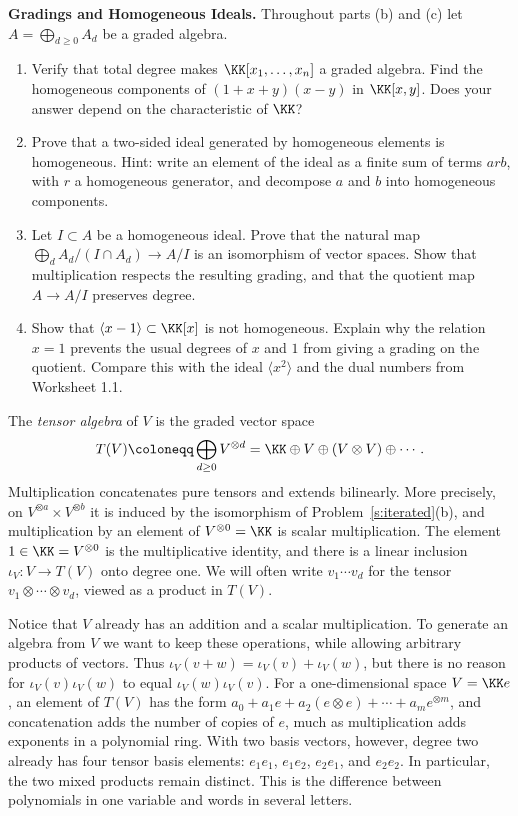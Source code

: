 \documentclass[12pt,reqno]{amsart}
\begin{document}
\begin{problems}
\item\label{s:grading} \textbf{Gradings and Homogeneous Ideals.} Throughout parts (b) and (c) let $A=\bigoplus_{d\geq0}A_d$ be a graded algebra.
\begin{enumerate}
\item Verify that total degree makes $\KK[x_1,\ldots,x_n]$ a graded algebra. Find the homogeneous components of $(1+x+y)(x-y)$ in $\KK[x,y]$. Does your answer depend on the characteristic of $\KK$?
\item Prove that a two-sided ideal generated by homogeneous elements is homogeneous. Hint: write an element of the ideal as a finite sum of terms $arb$, with $r$ a homogeneous generator, and decompose $a$ and $b$ into homogeneous components.
\item Let $I\subset A$ be a homogeneous ideal. Prove that the natural map $\bigoplus_dA_d/(I\cap A_d)\to A/I$ is an isomorphism of vector spaces. Show that multiplication respects the resulting grading, and that the quotient map $A\to A/I$ preserves degree.
\item Show that $\langle x-1\rangle\subset\KK[x]$ is not homogeneous. Explain why the relation $x=1$ prevents the usual degrees of $x$ and $1$ from giving a grading on the quotient. Compare this with the ideal $\langle x^2\rangle$ and the dual numbers from Worksheet 1.1.
\end{enumerate}
\end{problems}

\hrulefill

The \emph{tensor algebra} of $V$ is the graded vector space
\[
T(V)\coloneqq\bigoplus_{d\geq0}V^{\otimes d}=\KK\oplus V\oplus(V\otimes V)\oplus\cdots.
\]
Multiplication concatenates pure tensors and extends bilinearly. More precisely, on $V^{\otimes a}\times V^{\otimes b}$ it is induced by the isomorphism of Problem~\ref{s:iterated}(b), and multiplication by an element of $V^{\otimes0}=\KK$ is scalar multiplication. The element $1\in\KK=V^{\otimes0}$ is the multiplicative identity, and there is a linear inclusion $\iota_V:V\to T(V)$ onto degree one. We will often write $v_1\cdots v_d$ for the tensor $v_1\otimes\cdots\otimes v_d$, viewed as a product in $T(V)$.

Notice that $V$ already has an addition and a scalar multiplication. To generate an algebra from $V$ we want to keep these operations, while allowing arbitrary products of vectors. Thus $\iota_V(v+w)=\iota_V(v)+\iota_V(w)$, but there is no reason for $\iota_V(v)\iota_V(w)$ to equal $\iota_V(w)\iota_V(v)$. For a one-dimensional space $V=\KK e$, an element of $T(V)$ has the form $a_0+a_1e+a_2(e\otimes e)+\cdots+a_me^{\otimes m}$, and concatenation adds the number of copies of $e$, much as multiplication adds exponents in a polynomial ring. With two basis vectors, however, degree two already has four tensor basis elements: $e_1e_1$, $e_1e_2$, $e_2e_1$, and $e_2e_2$. In particular, the two mixed products remain distinct. This is the difference between polynomials in one variable and words in several letters.
\end{document}
